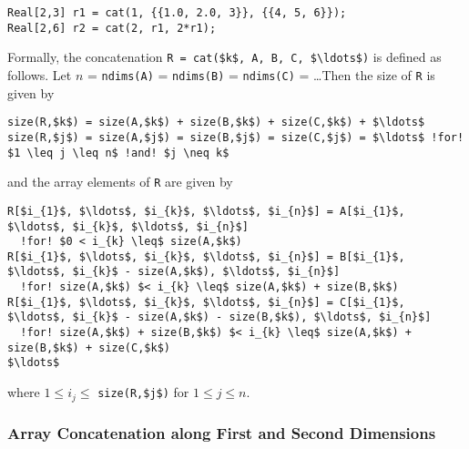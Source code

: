 \begin{example}
\begin{lstlisting}[language=modelica]
Real[2,3] r1 = cat(1, {{1.0, 2.0, 3}}, {{4, 5, 6}});
Real[2,6] r2 = cat(2, r1, 2*r1);
\end{lstlisting}
\end{example}

Formally, the concatenation \lstinline!R = cat($k$, A, B, C, $\ldots$)! is defined as follows.  Let $n$ = \lstinline!ndims(A)! = \lstinline!ndims(B)! = \lstinline!ndims(C)! = \ldots  Then the size of \lstinline!R! is given by
\begin{lstlisting}[language=modelica,escapechar=!,frame=none,xleftmargin=1em]
size(R,$k$) = size(A,$k$) + size(B,$k$) + size(C,$k$) + $\ldots$
size(R,$j$) = size(A,$j$) = size(B,$j$) = size(C,$j$) = $\ldots$ !for! $1 \leq j \leq n$ !and! $j \neq k$
\end{lstlisting}
and the array elements of \lstinline!R! are given by
\begin{lstlisting}[language=modelica,escapechar=!,frame=none,xleftmargin=1em]
R[$i_{1}$, $\ldots$, $i_{k}$, $\ldots$, $i_{n}$] = A[$i_{1}$, $\ldots$, $i_{k}$, $\ldots$, $i_{n}$]
  !for! $0 < i_{k} \leq$ size(A,$k$)
R[$i_{1}$, $\ldots$, $i_{k}$, $\ldots$, $i_{n}$] = B[$i_{1}$, $\ldots$, $i_{k}$ - size(A,$k$), $\ldots$, $i_{n}$]
  !for! size(A,$k$) $< i_{k} \leq$ size(A,$k$) + size(B,$k$)
R[$i_{1}$, $\ldots$, $i_{k}$, $\ldots$, $i_{n}$] = C[$i_{1}$, $\ldots$, $i_{k}$ - size(A,$k$) - size(B,$k$), $\ldots$, $i_{n}$]
  !for! size(A,$k$) + size(B,$k$) $< i_{k} \leq$ size(A,$k$) + size(B,$k$) + size(C,$k$)
$\ldots$
\end{lstlisting}
where $1 \leq i_{j} \leq$ \lstinline!size(R,$j$)! for $1 \leq j \leq n$.


\subsubsection{Array Concatenation along First and Second Dimensions}

